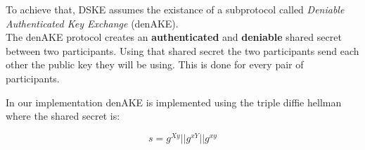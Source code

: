 \begin{frame}
  To achieve that, DSKE assumes the existance of a subprotocol called \emph{Deniable Authenticated Key Exchange} (denAKE).\\[0.3cm]

  The denAKE protocol creates an {\bf authenticated} and {\bf deniable} shared secret between two participants. Using that shared secret the two participants send each other the public key they will be using. This is done for every pair of participants.\\[0.3cm]

  \begin{minipage}{.47\textwidth}
    In our implementation denAKE is implemented using the triple diffie hellman where the shared secret is:

    \[
      s = g^{Xy} || g^{xY} || g^{xy}
    \]

  \end{minipage}
  \begin{minipage}{.47\textwidth}
     \begin{figure}
      \scalebox{0.5}{ }
    \end{figure}
  \end{minipage}
\end{frame}
